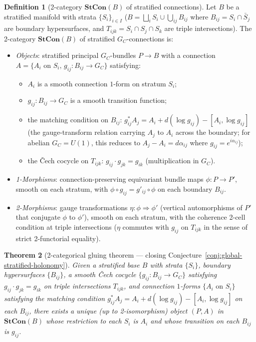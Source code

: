 \documentclass[11pt,a4paper]{article}
\theoremstyle{plain}
\newtheorem{theorem}{Theorem}[section]
\theoremstyle{definition}
\newtheorem{definition}[theorem]{Definition}
\theoremstyle{remark}
\begin{document}
\begin{definition}[2-category $\mathbf{StCon}(B)$ of stratified connections]
\label{def:stcon}
Let $B$ be a stratified manifold with strata $\{S_i\}_{i \in I}$
($B = \bigsqcup_i S_i \cup \bigcup_{ij} B_{ij}$ where $B_{ij} = S_i \cap
\bar S_j$ are boundary hypersurfaces, and $T_{ijk} = S_i \cap S_j \cap
S_k$ are triple intersections). The 2-category $\mathbf{StCon}(B)$ of
stratified $G_C$-connections is:
\begin{itemize}[leftmargin=*,itemsep=2pt]
\item \emph{Objects}: stratified principal $G_C$-bundles $P \to B$ with
  a connection
  $A = \{A_i \text{ on } S_i, \, g_{ij} : B_{ij} \to G_C\}$ satisfying:
  \begin{itemize}
  \item[(O1)] $A_i$ is a smooth connection $1$-form on stratum $S_i$;
  \item[(O2)] $g_{ij} : B_{ij} \to G_C$ is a smooth transition function;
  \item[(O3)] the matching condition on $B_{ij}$:
    $g_{ij}^* A_j = A_i + d(\log g_{ij}) - [A_i, \log g_{ij}]$
    (the gauge-transform relation carrying $A_j$ to $A_i$ across the
    boundary; for abelian $G_C = U(1)$, this reduces to
    $A_j - A_i = d\alpha_{ij}$ where $g_{ij} = e^{i \alpha_{ij}}$);
  \item[(O4)] the Čech cocycle on $T_{ijk}$: $g_{ij} \cdot g_{jk} =
    g_{ik}$ (multiplication in $G_C$).
  \end{itemize}
\item \emph{1-Morphisms}: connection-preserving equivariant bundle maps
  $\phi : P \to P'$, smooth on each stratum, with $\phi \circ g_{ij} =
  g'_{ij} \circ \phi$ on each boundary $B_{ij}$.
\item \emph{2-Morphisms}: gauge transformations $\eta : \phi \Rightarrow
  \phi'$ (vertical automorphisms of $P'$ that conjugate $\phi$ to
  $\phi'$), smooth on each stratum, with the coherence 2-cell condition
  at triple intersections ($\eta$ commutes with $g_{ij}$ on $T_{ijk}$
  in the sense of strict 2-functorial equality).
\end{itemize}
\end{definition}

\begin{theorem}[2-categorical gluing theorem --- closing
Conjecture~\ref{conj:global-stratified-holonomy}]
\label{thm:2cat-gluing}
Given a stratified base $B$ with strata $\{S_i\}$, boundary hypersurfaces
$\{B_{ij}\}$, a smooth Čech cocycle $\{g_{ij} : B_{ij} \to G_C\}$
satisfying $g_{ij} \cdot g_{jk} = g_{ik}$ on triple intersections
$T_{ijk}$, and connection $1$-forms $\{A_i \text{ on } S_i\}$ satisfying
the matching condition $g_{ij}^* A_j = A_i + d(\log g_{ij}) - [A_i, \log
g_{ij}]$ on each $B_{ij}$, there exists a unique (up to 2-isomorphism)
object $(P, A)$ in $\mathbf{StCon}(B)$ whose restriction to each $S_i$
is $A_i$ and whose transition on each $B_{ij}$ is $g_{ij}$.
\end{theorem}
\end{document}
